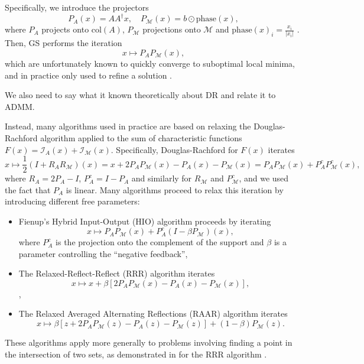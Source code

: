 \documentclass[12pt]{article}
\theoremstyle{definition}
\theoremstyle{remark}
\theoremstyle{definition}
\theoremstyle{problem}
\theoremstyle{definition}
\newcommand{\col}{\text{col}}
\newcommand{\phase}{\text{phase}}
\newcommand{\II}{\mathcal{I} }
\newcommand{\MM}{\mathcal{M}}
\newcommand{\TODO}[1]{{\color{red}{[#1]}}}
\begin{document}
Specifically, we introduce the projectors 
\begin{equation}\label{eq:projections}
    P_A(x) = AA^{\dagger}x, \quad P_{\MM}(x)=b\odot \phase(x),
\end{equation}
where $P_A$ projects onto $\col(A)$, $P_{\MM}$ projections onto $\MM$ and $\phase(x)_i=\frac{x_i}{|x_i|}$ \TODO{Notation should be explained...}. Then, GS performs the iteration 
\begin{equation}\label{eq:GS}
    x\mapsto P_AP_{\MM}(x),    
\end{equation}
which are unfortunately known to quickly converge to suboptimal local minima, and in practice only used to refine a solution \cite{Elser2017, Marchesini2007}. 

We also need to say what it known theoretically about DR and relate it to ADMM.

Instead, many algorithms used in practice are based on relaxing the Douglas-Rachford algorithm applied to the sum of characteristic functions $F(x) = \II_{A}(x)+\II_{\MM}(x)$. Specifically, Douglas-Rachford for $F(x)$ iterates \begin{equation}\label{eq:Doug_Rach}
    x\mapsto \frac{1}{2}(I+R_AR_{\MM})(x) = x + 2P_AP_{\MM}(x) - P_A(x) - P_{\MM}(x) = P_AP_{\MM}(x) + P_A^cP_{\MM}^c(x),
\end{equation} 
where $R_A = 2P_A-I$, $P_A^c=I-P_A$ and similarly for $R_{\MM}$ and $P_{\MM}^c$, and we used the fact that $P_A$ is linear. Many algorithms proceed to relax this iteration by introducing different free parameters\TODO{Rewrite in terms of reflections?}:

\begin{itemize}
    \item Fienup's Hybrid Input-Output (HIO) algorithm proceeds by iterating 
    \begin{equation}\label{eq:HIO}
        x\mapsto P_AP_{\MM}(x) + P_A^c(I-\beta P_{\MM})(x),
    \end{equation} 
    where $P_A^c$ is the projection onto the complement of the support and $\beta$ is a parameter controlling the ``negative feedback'',
    \item The Relaxed-Reflect-Reflect (RRR) algorithm iterates
    \begin{equation}\label{eq:RRR}
        x\mapsto x + \beta\left[2P_AP_{\MM}(x)-P_A(x)-P_{\MM}(x)\right],
    \end{equation},
    \item The Relaxed Averaged Alternating Reflections (RAAR) algorithm iterates
    \begin{equation}\label{eq:RAAR}
        x\mapsto \beta\left[z + 2P_AP_{\MM}(z)-P_A(z)-P_{\MM}(z)\right] + (1-\beta)P_{\MM}(z).
    \end{equation}
\end{itemize}
These algorithms apply more generally to problems involving finding a point in the intersection of two sets, as demonstrated in \TODO{Veit, PNAS} for the RRR algorithm \TODO{Actually, "difference map"}.
\end{document}
